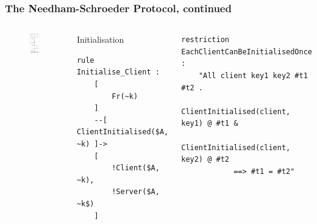 \documentclass[aspectratio=169,t,xcolor=table]{beamer}
\begin{document}
\begin{frame}[fragile]
    \frametitle{The Needham-Schroeder Protocol, continued}
    \begin{columns}
        \begin{figure}
            \centering
            \includegraphics[width=.8\textwidth]{images/NS.png}
        \end{figure}
        \begin{block}{Initialisation}
            \begin{lstlisting}[language=Tamarin]
rule Initialise_Client :
    [
        Fr(~k)
    ]
    --[ ClientInitialised($A, ~k) ]->
    [
        !Client($A, ~k),
        !Server($A, ~k$)
    ]\end{lstlisting}
        \end{block}
        \begin{block}{}
        \begin{lstlisting}[language=Tamarin]
restriction EachClientCanBeInitialisedOnce :
    "All client key1 key2 #t1 #t2 .
        ClientInitialised(client, key1) @ #t1 &
        ClientInitialised(client, key2) @ #t2
            ==> #t1 = #t2"\end{lstlisting}
        \end{block}
    \end{columns}
\end{frame}
\end{document}

